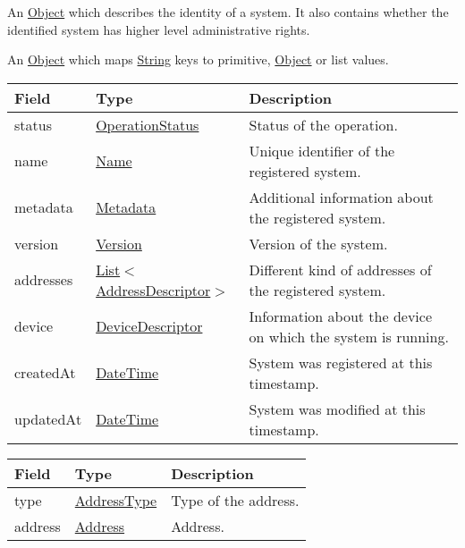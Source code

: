 \documentclass[a4paper]{arrowhead}
\newcommand{\pref}[1]{{\textcolor{ArrowheadGrey}{\hyperref[sec:model:primitives:#1]{#1}}}}
\begin{document}
\label{sec:model:Identity}

An \pref{Object} which describes the identity of a system. It also contains whether the identified system has higher level administrative rights.

\label{sec:model:Metadata}

An \pref{Object} which maps \pref{String} keys to primitive, \pref{Object} or list values.

\clearpage

\label{sec:model:SystemRegistrationResponse}
 
\begin{table}[ht!]
\begin{tabularx}{\textwidth}{| p{4.25cm} | p{4cm} | X |} \hline
\rowcolor{gray!33} Field & Type      & Description \\ \hline
status & \pref{OperationStatus} & Status of the operation. \\ \hline
name & \pref{Name} & Unique identifier of the registered system. \\ \hline
metadata & \hyperref[sec:model:Metadata]{Metadata} & Additional information about the registered system. \\ \hline
version & \pref{Version} & Version of the system. \\ \hline
addresses &  \pref{List}$<$\hyperref[sec:model:AddressDescriptor]{AddressDescriptor}$>$ & Different kind of addresses of the registered system.  \\ \hline
device & \hyperref[sec:model:DeviceDescriptor]{DeviceDescriptor} & Information about the device on which the system is running. \\ \hline
createdAt & \pref{DateTime} & System was registered at this timestamp. \\ \hline
updatedAt & \pref{DateTime} & System was modified at this timestamp. \\ \hline
\end{tabularx}
\end{table}

\label{sec:model:AddressDescriptor}

\begin{table}[ht!]
\begin{tabularx}{\textwidth}{| p{4.25cm} | p{3.5cm} | X |} \hline
\rowcolor{gray!33} Field & Type      & Description \\ \hline
type & \pref{AddressType} & Type of the address. \\ \hline
address & \pref{Address} & Address. \\ \hline
\end{tabularx}
\end{table}
\end{document}
